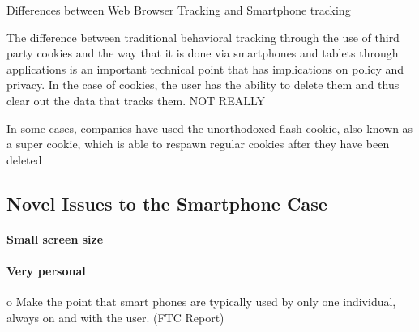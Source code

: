 Differences between Web Browser Tracking and Smartphone tracking

The difference between traditional behavioral tracking through the use of third party cookies and the way that it is done via smartphones and tablets through applications is an important technical point that has implications on policy and privacy. In the case of cookies, the user has the ability to delete them and thus clear out the data that tracks them. NOT REALLY

In some cases, companies have used the unorthodoxed flash cookie, also known as a super cookie, which is able to respawn regular cookies after they have been deleted


	\subsection{Novel Issues to the Smartphone Case}

		\paragraph{Small screen size} %

		\paragraph{Very personal}     %

o Make the point that smart phones are typically used by only one individual, always on and with the user. (FTC Report)





